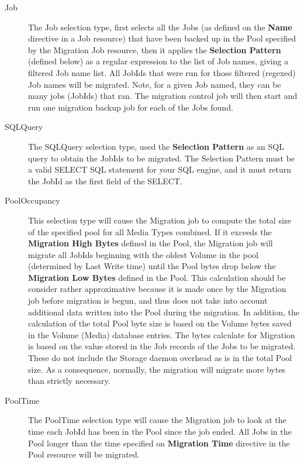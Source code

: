 \begin{description}
\begin{description}
  \item [Job] The Job selection type, first selects all the Jobs (as
        defined on the {\bf Name} directive in a Job resource)
        that have been backed up in the Pool specified by the Migration
        Job resource, then it applies the {\bf Selection Pattern} (defined
        below) as a regular expression to the list of Job names, giving
        a filtered Job name list.  All JobIds that were run for those
        filtered (regexed) Job names will be migrated.  Note, for a given
        Job named, they can be many jobs (JobIds) that ran.
        The migration control job will then start and run one migration
        backup job for each of the Jobs found.

  \item [SQLQuery] The SQLQuery selection type, used the {\bf Selection
        Pattern} as an SQL query to obtain the JobIds to be migrated.
        The Selection Pattern must be a valid SELECT SQL statement for your
        SQL engine, and it must return the JobId as the first field
        of the SELECT.

  \item [PoolOccupancy] This selection type will cause the Migration job
        to compute the total size of the specified pool for all Media Types
        combined. If it exceeds the {\bf Migration High Bytes} defined in
        the Pool, the Migration job will migrate all JobIds beginning with
        the oldest Volume in the pool (determined by Last Write time) until
        the Pool bytes drop below the {\bf Migration Low Bytes} defined in the
        Pool. This calculation should be consider rather approximative because
        it is made once by the Migration job before migration is begun, and
        thus does not take into account additional data written into the Pool
        during the migration.  In addition, the calculation of the total Pool
        byte size is based on the Volume bytes saved in the Volume (Media)
database
        entries. The bytes calculate for Migration is based on the value stored
        in the Job records of the Jobs to be migrated. These do not include the
        Storage daemon overhead as is in the total Pool size. As a consequence, 
        normally, the migration will migrate more bytes than strictly necessary.

  \item [PoolTime] The PoolTime selection type will cause the Migration job to
        look at the time each JobId has been in the Pool since the job ended.
        All Jobs in the Pool longer than the time specified on {\bf Migration Time} 
        directive in the Pool resource will be migrated.


\end{description}
\end{description}
